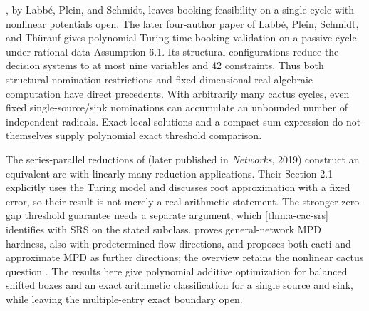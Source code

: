 \citet[Section 6]{labbe2020-bookings-in-the-european-gas}, by Labb\'e,
Plein, and Schmidt, leaves booking feasibility on a single cycle with
nonlinear potentials open.
The later four-author paper of Labb\'e, Plein, Schmidt, and Th\"urauf
\citep[Section 6, Theorems 6.4--6.5 and Corollary 6.6
(numbering of the November 2020 manuscript)]{labbe2021-deciding-feasibility-on-a-cycle}
gives polynomial Turing-time booking validation on a passive cycle
under rational-data Assumption 6.1. Its structural configurations reduce
the decision systems to at most nine variables and 42 constraints.
Thus both structural nomination restrictions and fixed-dimensional
real algebraic computation have direct precedents. With arbitrarily
many cactus cycles, even fixed single-source/sink nominations can
accumulate an unbounded number of independent radicals. Exact local
solutions and a compact sum expression do not themselves supply
polynomial exact threshold comparison.

The series-parallel reductions of
\citet[Lemma 4.2 and Theorem 4.3]{gro2017-algorithmic-results-for-potential-based}
(later published in \emph{Networks}, 2019) construct an equivalent arc with
linearly many reduction applications. Their Section 2.1 explicitly
uses the Turing model and discusses root approximation with a fixed
error, so their result is not merely a real-arithmetic statement.
The stronger zero-gap threshold guarantee needs a separate argument,
which \cref{thm:a-cac-srs} identifies with SRS on the stated subclass.
\citet[Lemma 4.20 and Section 5]{thurauf2022-deciding-the-feasibility-of-a}
proves general-network MPD hardness, also with predetermined flow
directions, and proposes both cacti and approximate MPD as further
directions; the overview retains the nonlinear cactus question
\citep[pp.~9--10]{pfetsch2026-potential-based-flowsan-overview}.
The results here give polynomial additive optimization for balanced
shifted boxes and an exact arithmetic classification for a single
source and sink, while leaving the multiple-entry exact boundary open.
